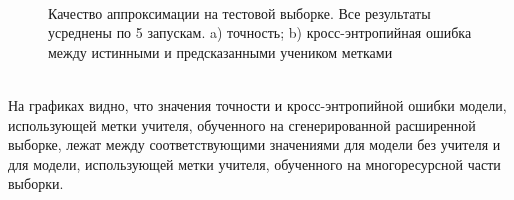 \begin{figure}[h!t]\center
{}
\\
\caption{Качество аппроксимации на тестовой выборке. Все результаты усреднены по 5 запускам. a) точность; b) кросс-энтропийная ошибка между истинными и предсказанными учеником метками}
\end{figure}\\

На графиках видно, что значения точности и кросс-энтропийной ошибки модели, использующей метки учителя, обученного на сгенерированной расширенной выборке, лежат между соответствующими значениями для модели без учителя и для модели, использующей метки учителя, обученного на многоресурсной части выборки.